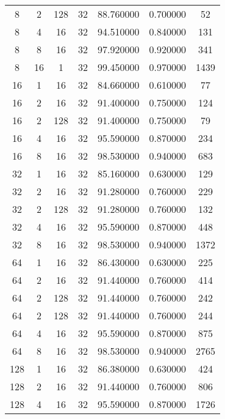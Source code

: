\begin{table}
\begin{tabular}{ccccccc}
8 & 2 & 128 & 32 & 88.760000 & 0.700000 & 52 \\
8 & 4 & 16 & 32 & 94.510000 & 0.840000 & 131 \\
8 & 8 & 16 & 32 & 97.920000 & 0.920000 & 341 \\
8 & 16 & 1 & 32 & 99.450000 & 0.970000 & 1439 \\
16 & 1 & 16 & 32 & 84.660000 & 0.610000 & 77 \\
16 & 2 & 16 & 32 & 91.400000 & 0.750000 & 124 \\
16 & 2 & 128 & 32 & 91.400000 & 0.750000 & 79 \\
16 & 4 & 16 & 32 & 95.590000 & 0.870000 & 234 \\
16 & 8 & 16 & 32 & 98.530000 & 0.940000 & 683 \\
32 & 1 & 16 & 32 & 85.160000 & 0.630000 & 129 \\
32 & 2 & 16 & 32 & 91.280000 & 0.760000 & 229 \\
32 & 2 & 128 & 32 & 91.280000 & 0.760000 & 132 \\
32 & 4 & 16 & 32 & 95.590000 & 0.870000 & 448 \\
32 & 8 & 16 & 32 & 98.530000 & 0.940000 & 1372 \\
64 & 1 & 16 & 32 & 86.430000 & 0.630000 & 225 \\
64 & 2 & 16 & 32 & 91.440000 & 0.760000 & 414 \\
64 & 2 & 128 & 32 & 91.440000 & 0.760000 & 242 \\
64 & 2 & 128 & 32 & 91.440000 & 0.760000 & 244 \\
64 & 4 & 16 & 32 & 95.590000 & 0.870000 & 875 \\
64 & 8 & 16 & 32 & 98.530000 & 0.940000 & 2765 \\
128 & 1 & 16 & 32 & 86.380000 & 0.630000 & 424 \\
128 & 2 & 16 & 32 & 91.440000 & 0.760000 & 806 \\
128 & 4 & 16 & 32 & 95.590000 & 0.870000 & 1726 \\
\bottomrule
\end{tabular}
\end{table}
